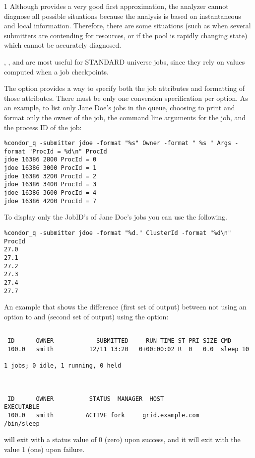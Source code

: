 \begin{ManPage}{\label{man-condor-q}}{1}
\GenRem
Although  provides a very good first approximation, the analyzer 
cannot diagnose all possible situations because the analysis is based on 
instantaneous and local information.  Therefore, there are some situations 
(such as when several submitters are contending for resources, or if the pool 
is rapidly changing state) which cannot be accurately diagnosed.

, , and  are most useful for STANDARD
universe jobs, since they rely on values computed when a job
checkpoints.

\Examples

The  option provides a way to specify both the job attributes
and formatting of those attributes.
There must be only one conversion specification per  option.
As an example, to list only Jane Doe's jobs in the queue,
choosing to print and format only the owner of the job,
the command line arguments for the job, and the
process ID of the job:
\footnotesize
\begin{verbatim}
%condor_q -submitter jdoe -format "%s" Owner -format " %s " Args -format "ProcId = %d\n" ProcId
jdoe 16386 2800 ProcId = 0
jdoe 16386 3000 ProcId = 1
jdoe 16386 3200 ProcId = 2
jdoe 16386 3400 ProcId = 3
jdoe 16386 3600 ProcId = 4
jdoe 16386 4200 ProcId = 7
\end{verbatim}
\normalsize

To display only the JobID's of Jane Doe's jobs you can use the following.
\footnotesize
\begin{verbatim}
%condor_q -submitter jdoe -format "%d." ClusterId -format "%d\n" ProcId
27.0
27.1
27.2
27.3
27.4
27.7
\end{verbatim}
\normalsize

An example that shows the difference (first set of output)
between not using an option to  and (second
set of output) using the  option:
\footnotesize
\begin{verbatim}

 ID      OWNER            SUBMITTED     RUN_TIME ST PRI SIZE CMD
 100.0   smith          12/11 13:20   0+00:00:02 R  0   0.0  sleep 10

1 jobs; 0 idle, 1 running, 0 held



 ID      OWNER          STATUS  MANAGER  HOST                EXECUTABLE
 100.0   smith         ACTIVE fork     grid.example.com       /bin/sleep
\end{verbatim}
\normalsize

\ExitStatus

 will exit with a status value of 0 (zero) upon success,
and it will exit with the value 1 (one) upon failure.

\end{ManPage}
